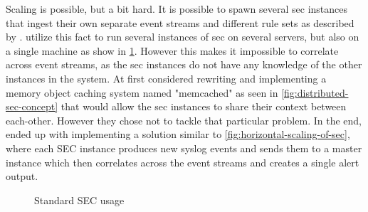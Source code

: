 Scaling is possible, but a bit hard. It is possible to spawn several \acrshort{sec} instances that ingest their own separate event streams and different rule sets as described by \textcite{vaarandi2015practices}. \textcite{sec-distributed} utilize this fact to run several instances of \acrshort{sec} on several servers, but also on a single machine as show in \cref{fig:standard-sec-usage}. However this makes it impossible to correlate across event streams, as the \acrshort{sec} instances do not have any knowledge of the other instances in the system. At first \textcite{sec-distributed} considered rewriting and implementing a memory object caching system named "memcached" \cite{memcache74:online} as seen in \cref{fig:distributed-sec-concept} that would allow the \acrshort{sec} instances to share their context between each-other. However they chose not to tackle that particular problem. In the end, \textcite{sec-distributed} ended up with implementing a solution similar to \cref{fig:horizontal-scaling-of-sec}, where each SEC instance produces new syslog events and sends them to a master instance which then correlates across the event streams and creates a single alert output.

\begin{figure}[htbp]
\centering
{}
\caption{Standard SEC usage}
\label{fig:standard-sec-usage}
\end{figure}



